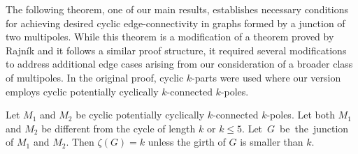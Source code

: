 \documentclass[12pt, twoside]{book}
\begin{document}
The following theorem, one of our main results, establishes necessary conditions for achieving desired cyclic edge-connectivity in graphs formed by a junction of two multipoles. While this theorem is a modification of a theorem proved by Rajník \cite{Rajnik_phd} and it follows a similar proof structure, it required several modifications to address additional edge cases arising from our consideration of a broader class of multipoles. In the original proof, cyclic $k$-parts were used where our version employs cyclic potentially cyclically $k$-connected $k$-poles.

\begin{theorem}\label{th:junction-of-kpoles-cyclic-edge-connectivity}
	Let $M_1$ and $M_2$ be cyclic potentially cyclically $k$-connected $k$-poles. Let both $M_1$ and $M_2$ be different from the cycle of length $k$ or $k\leq 5$. \mbox{Let $G$ be the junction} of $M_1$ and $M_2$. Then $\zeta(G)=k$ unless the girth of $G$ is smaller than $k$.
\end{theorem}
\end{document}
